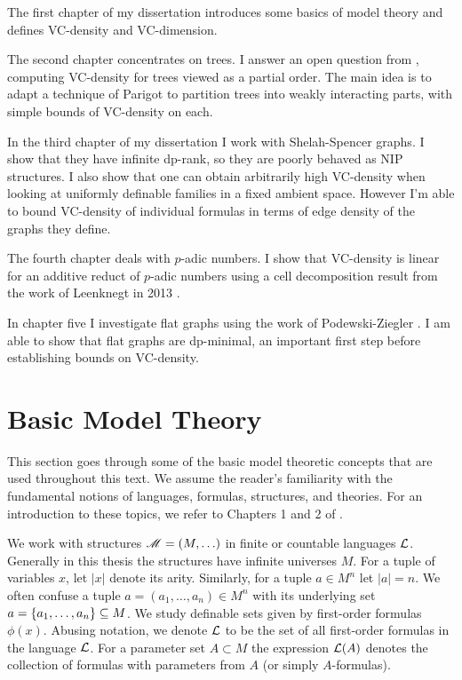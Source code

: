 The first chapter of my dissertation introduces some basics of model theory and defines VC-density and VC-dimension.

The second chapter concentrates on trees.
I answer an open question from \cite{density}, computing VC-density for trees viewed as a partial order.
The main idea is to adapt a technique of Parigot \cite{parigot_trees} to partition trees into weakly interacting parts, with simple bounds of VC-density on each.

In the third chapter of my dissertation I work with Shelah-Spencer graphs.
I show that they have infinite dp-rank, so they are poorly behaved as NIP structures.
I also show that one can obtain arbitrarily high VC-density when looking at uniformly definable families in a fixed ambient space.
However I'm able to bound VC-density of individual formulas in terms of edge density of the graphs they define.

The fourth chapter deals with $p$-adic numbers.
I show that VC-density is linear for an additive reduct of $p$-adic numbers
using a cell decomposition result from the work of Leenknegt in 2013 \cite{reduct}.

In chapter five I investigate flat graphs using the work of
Podewski-Ziegler \cite {stable_graphs}.
I am able to show that flat graphs are dp-minimal, an important first step before establishing bounds on VC-density.

\section{Basic Model Theory}

This section goes through some of the basic model theoretic concepts that are used throughout this text.
We assume the reader's familiarity with the fundamental notions of languages, formulas, structures, and theories.
For an introduction to these topics, we refer to Chapters 1 and 2 of \cite{tent}.

We work with structures $\mathscr M = (M, \ldots)$ in finite or countable languages $\mathcal L$.
Generally in this thesis the structures have infinite universes $M$.
For a tuple of variables $x$, let $|x|$ denote its arity.
Similarly, for a tuple $a \in M^n$ let $|a|=n$.
We often confuse a tuple $a = (a_1, \ldots, a_n) \in M^n$ with its underlying set $a = \left\{a_1, \ldots, a_n\right\} \subseteq M$.
We study definable sets given by first-order formulas $\phi(x)$.
Abusing notation, we denote $\mathcal L$ to be the set of all first-order formulas in the language $\mathcal L$.
For a parameter set $A \subset M$ the expression $\mathcal L(A)$ denotes the collection of formulas
with parameters from $A$ (or simply $A$-formulas).

